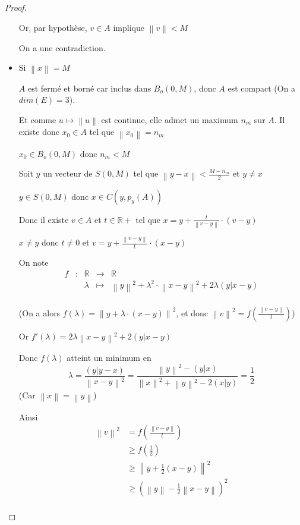 \documentclass[a4paper]{article}
\newcommand{\norm}[1]{\left\lVert#1\right\rVert}
\begin{document}
\begin{proof}
\begin{itemize}
    Or, par hypothèse, $v \in A$ implique $\norm{v} < M$

    On a une contradiction.

    \bigskip

    \item Si  $\norm{x} = M$

    $A$ est fermé et borné car inclus dans $B_{o}(0, M)$, donc $A$ est compact (On a $dim(E) = 3$).

    Et comme $u \mapsto \norm{u}$ est continue, elle admet un maximum $n_{m}$ sur $A$. Il existe donc $x_{0} \in A$ tel que $\norm{x_{0}} = n_{m}$

    $x_{0} \in B_{o}(0, M)$ donc $n_{m} < M$

    Soit $y$ un vecteur de $S(0, M)$ tel que $\norm{y - x} < \frac{M - n_{m}}{2}$ et $y \neq x$

    $y \in S(0, M)$ donc $x \in C(y, p_{y}(A))$

    Donc il existe $v \in A$ et $t \in \mathbb{R}+$ tel que $x = y + \frac{t}{\norm{v - y}} \cdot (v - y)$

    $x \neq y$ donc $t \neq 0$ et $v = y + \frac{\norm{v - y}}{t} \cdot (x - y)$

    On note 
    \[\begin{array}{ccccl}
    f & : & \mathbb{R} & \to & \mathbb{R} \\
     & & \lambda & \mapsto & \norm{y}^{2} + \lambda^{2} \cdot \norm{x - y}^{2} + 2 \lambda (y|x - y)\\
    \end{array}\]

    (On a alors $f(\lambda) = \norm{y + \lambda \cdot (x - y)}^{2}$, et donc $\norm{v}^{2} = f(\frac{\norm{v - y}}{t})$)

    Or $f'(\lambda) = 2 \lambda \norm{x - y}^{2} + 2(y|x - y)$

    Donc $f(\lambda)$ atteint un minimum en
    \[\lambda = \frac{(y|y - x)}{\norm{x - y}^2} = \frac{\norm{y}^{2} - (y|x)}{\norm{x}^{2} + \norm{y}^{2} - 2 (x|y)} = \frac{1}{2}\]
    (Car $\norm{x} = \norm{y}$)

    \medskip

    Ainsi 
    \begin{align*}
    \norm{v}^{2} &= f(\frac{\norm{v - y}}{t}) \\
                 &\geqslant f(\frac{1}{2}) \\
                 &\geqslant \norm{y + \frac{1}{2} (x - y)}^{2} \\
                 &\geqslant (\norm{y} - \frac{1}{2} \norm{x - y})^{2} \\
    \end{align*}


\end{itemize}
\end{proof}
\end{document}
